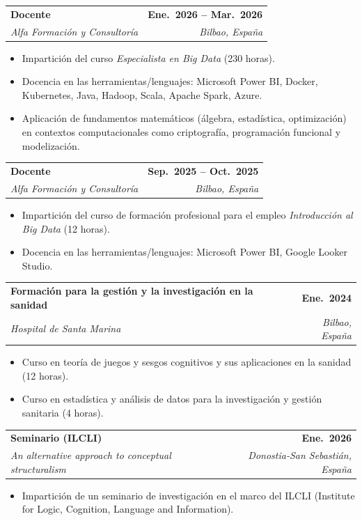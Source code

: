 \documentclass[11pt, a4paper]{article}
\makeatletter
\newcommand{\cventry}[4]{%
  \noindent
  \begin{tabularx}{\linewidth}{@{}X r@{}}
    \textbf{#1} & \textbf{#2}\\
    \textit{#3} & \textit{#4}
  \end{tabularx}%
}
\makeatother
\begin{document}
\cventry{Docente}%
        {Ene.\ 2026 -- Mar.\ 2026}%
        {Alfa Formación y Consultoría}%
        {Bilbao, España}
\begin{itemize}[nosep, leftmargin=1.2em, topsep=4pt]

  \item Impartición del curso \textit{Especialista en Big Data} (230 horas).
  \item Docencia en las herramientas/lenguajes: Microsoft Power BI, Docker, Kubernetes, Java, Hadoop, Scala, Apache Spark, Azure.
  \item Aplicación de fundamentos matemáticos (álgebra, estadística, optimización) en contextos computacionales como criptografía, programación funcional y modelización.
\end{itemize}

\cventry{Docente}%
        {Sep.\ 2025 -- Oct.\ 2025}%
        {Alfa Formación y Consultoría}%
        {Bilbao, España}
\begin{itemize}[nosep, leftmargin=1.2em, topsep=4pt]
  \item Impartición del curso de formación profesional para el empleo \textit{Introducción al Big Data} (12 horas).
  \item Docencia en las herramientas/lenguajes: Microsoft Power BI, Google Looker Studio.
\end{itemize}

\medskip
\cventry{Formación para la gestión y la investigación en la sanidad}%
        {Ene.\ 2024}%
        {Hospital de Santa Marina}%
        {Bilbao, España}
\begin{itemize}[nosep, leftmargin=1.2em, topsep=4pt]
  \item Curso en teoría de juegos y sesgos cognitivos y sus aplicaciones en la sanidad (12 horas).
  \item Curso en estadística y análisis de datos para la investigación y gestión sanitaria (4 horas).
\end{itemize}

\medskip
\cventry{Seminario (ILCLI)}%
        {Ene.\ 2026}%
        {\textit{An alternative approach to conceptual structuralism}}%
        {Donostia-San Sebastián, España}
\begin{itemize}[nosep, leftmargin=1.2em, topsep=4pt]
  \item Impartición de un seminario de investigación en el marco del ILCLI (Institute for Logic, Cognition, Language and Information). 
\end{itemize}
\end{document}
